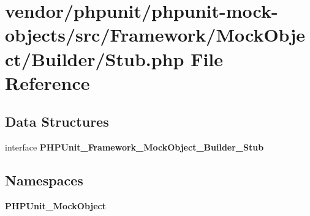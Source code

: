 \section{vendor/phpunit/phpunit-\/mock-\/objects/src/\+Framework/\+Mock\+Object/\+Builder/\+Stub.php File Reference}
\label{phpunit_2phpunit-mock-objects_2src_2_framework_2_mock_object_2_builder_2_stub_8php}
\subsection*{Data Structures}
\begin{DoxyCompactItemize}
\item 
interface {\bf P\+H\+P\+Unit\+\_\+\+Framework\+\_\+\+Mock\+Object\+\_\+\+Builder\+\_\+\+Stub}
\end{DoxyCompactItemize}
\subsection*{Namespaces}
\begin{DoxyCompactItemize}
\item 
 {\bf P\+H\+P\+Unit\+\_\+\+Mock\+Object}
\end{DoxyCompactItemize}
